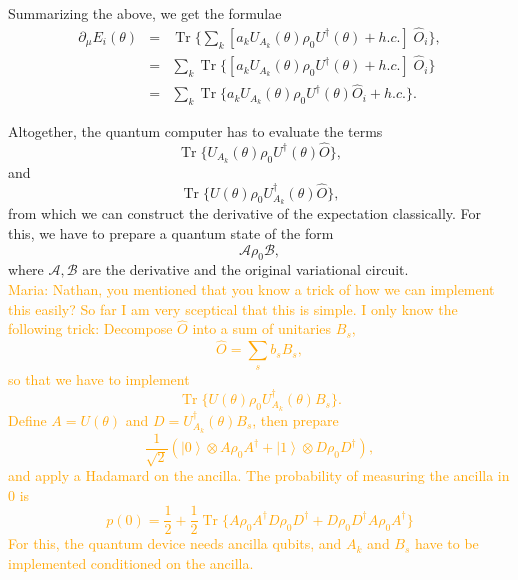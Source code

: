 \documentclass[amsmath,amssymb,aps,pra,10pt,twocolumn,groupedaddress,nofootinbib]{revtex4-1}
\DeclareMathOperator{\tr}{Tr}
\newcommand{\ket}[1]{\ensuremath{\left| #1 \right \rangle}}
\newcommand{\maria}[1]{\textcolor{orange}{Maria: #1}}
\begin{document}
Summarizing the above, we get the formulae
\begin{eqnarray*}
        \partial_{\mu} E_i(\theta) &=& \tr \{ \sum_k \left[ a_k  U_{A_k}(\theta) \rho_0 U^{\dagger}(\theta) + h.c. \right] \; \hat{O}_i\}, \\
        &=& \sum_k \tr \{  \left[ a_k  U_{A_k}(\theta) \rho_0 U^{\dagger}(\theta) + h.c. \right] \; \hat{O}_i\}\\
        &=& \sum_k \tr \{   a_k  U_{A_k}(\theta) \rho_0 U^{\dagger}(\theta) \hat{O}_i + h.c. \}.
\end{eqnarray*}

Altogether, the quantum computer has to evaluate the terms
\[ \tr \{  U_{A_k}(\theta) \rho_0 U^{\dagger}(\theta)  \hat{O} \},\]
and
\[ \tr \{  U(\theta) \rho_0 U_{A_k}^{\dagger}(\theta)  \hat{O} \},\]
from which we can construct the derivative of the expectation classically. For this, we have to prepare a quantum state of the form
\[ \mathcal{A} \rho_0 \mathcal{B}, \]
where $ \mathcal{A}, \mathcal{B}$ are the derivative and the original variational circuit. \\

\maria{Nathan, you mentioned that you know a trick of how we can implement this easily? So far I am very sceptical that this is simple. I only know the following trick:
Decompose $\hat{O}$ into a sum of unitaries $B_s$,
\[\hat{O} = \sum_s b_s B_s,\]
so that we have to implement
\[ \tr \{  U(\theta) \rho_0 U_{A_k}^{\dagger}(\theta)  B_s \}.\]
Define $A=U(\theta)$ and $D=U_{A_k}^{\dagger}(\theta)  B_s$, then prepare
\[ \frac{1}{\sqrt{2}} (\ket{0} \otimes A\rho_0 A^{\dagger} + \ket{1} \otimes D\rho_0 D^{\dagger}),\]
and apply a Hadamard on the ancilla. The probability of measuring the ancilla in $0$ is
\[p(0) = \frac{1}{2} + \frac{1}{2} \tr \{ A\rho_0 A^{\dagger} D\rho_0 D^{\dagger} +D\rho_0 D^{\dagger} A\rho_0 A^{\dagger}  \} \]
For this, the quantum device needs ancilla qubits, and $A_k$ and $B_s$ have to be implemented conditioned on the ancilla. }

%

\end{document}
